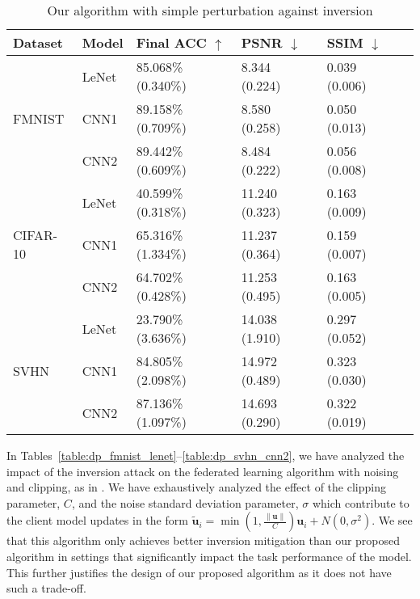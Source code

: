 \documentclass[conference,compsoc]{IEEEtran}
\begin{document}
\begin{table}[H]
\centering
\caption{Our algorithm with simple perturbation against inversion}
\label{table:perturbed_nerv_inv}
\begin{tabular}{llllll}
\hline
\textbf{Dataset} & \textbf{Model} & \textbf{Final ACC} $\uparrow$ & \textbf{PSNR} $\downarrow$ & \textbf{SSIM} $\downarrow$ \\
\hline
\multirow{3}{*}{FMNIST} & LeNet & 85.068\% (0.340\%) & 8.344 (0.224) & 0.039 (0.006) \\
& CNN1 & 89.158\% (0.709\%) & 8.580 (0.258) & 0.050 (0.013) \\
& CNN2 & 89.442\% (0.609\%) & 8.484 (0.222) & 0.056 (0.008) \\
\hline
\multirow{3}{*}{CIFAR-10} & LeNet & 40.599\% (0.318\%) & 11.240 (0.323) & 0.163 (0.009) \\
& CNN1 & 65.316\% (1.334\%) & 11.237 (0.364) & 0.159 (0.007) \\
& CNN2 & 64.702\% (0.428\%) & 11.253 (0.495) & 0.163 (0.005) \\
\hline
\multirow{3}{*}{SVHN} & LeNet & 23.790\% (3.636\%) & 14.038 (1.910) & 0.297 (0.052) \\
& CNN1 & 84.805\% (2.098\%) & 14.972 (0.489) & 0.323 (0.030) \\
& CNN2 & 87.136\% (1.097\%) & 14.693 (0.290) & 0.322 (0.019) \\
\hline
\end{tabular}
\end{table}

\noindent In Tables~\ref{table:dp_fmnist_lenet}--\ref{table:dp_svhn_cnn2}, we have analyzed the impact of the inversion attack on the federated learning algorithm with noising and clipping, as in \cite{mcmahan2018learning}. We have exhaustively analyzed the effect of the clipping parameter, $C$, and the noise standard deviation parameter, $\sigma$ which contribute to the client model updates in the form $\tilde{\bm{u}}_i = \min\left(1, \frac{\|\bm{u}\|}{C}\right) \bm{u}_i + N(0, \sigma^2)$. We see that this algorithm only achieves better inversion mitigation than our proposed algorithm in settings that significantly impact the task performance of the model. This further justifies the design of our proposed algorithm as it does not have such a trade-off.
\end{document}
